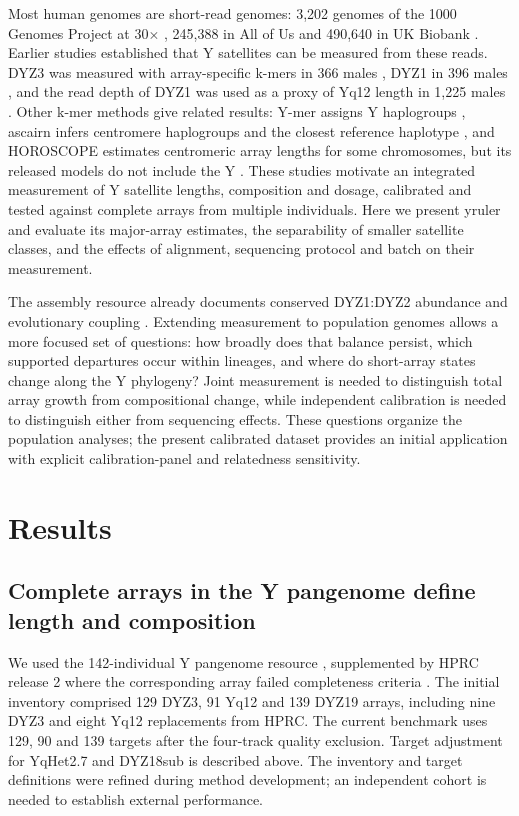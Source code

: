\documentclass[pdflatex,sn-nature]{sn-jnl}
\begin{document}
Most human genomes are short-read genomes: 3,202 genomes of the 1000 Genomes Project at 30$\times$ \cite{ByrskaBishop2022}, 245,388 in All of Us \cite{AoU2024} and 490,640 in UK Biobank \cite{UKB2025}. Earlier studies established that Y satellites can be measured from these reads. DYZ3 was measured with array-specific k-mers in 366 males \cite{Miga2014}, DYZ1 in 396 males \cite{Altemose2014}, and the read depth of DYZ1 was used as a proxy of Yq12 length in 1,225 males \cite{SanRoman2024}. Other k-mer methods give related results: Y-mer assigns Y haplogroups \cite{Puurand2025}, ascairn infers centromere haplogroups and the closest reference haplotype \cite{Shiraishi2026}, and HOROSCOPE estimates centromeric array lengths for some chromosomes, but its released models do not include the Y \cite{Hain2026}. These studies motivate an integrated measurement of Y satellite lengths, composition and dosage, calibrated and tested against complete arrays from multiple individuals. Here we present yruler and evaluate its major-array estimates, the separability of smaller satellite classes, and the effects of alignment, sequencing protocol and batch on their measurement.

The assembly resource already documents conserved DYZ1:DYZ2 abundance and evolutionary coupling \cite{Hallast2026}. Extending measurement to population genomes allows a more focused set of questions: how broadly does that balance persist, which supported departures occur within lineages, and where do short-array states change along the Y phylogeny? Joint measurement is needed to distinguish total array growth from compositional change, while independent calibration is needed to distinguish either from sequencing effects. These questions organize the population analyses; the present calibrated dataset provides an initial application with explicit calibration-panel and relatedness sensitivity.

\section{Results}\label{sec:results}

\subsection{Complete arrays in the Y pangenome define length and composition}\label{sec:res-truth}
We used the 142-individual Y pangenome resource \cite{Hallast2026}, supplemented by HPRC release 2 where the corresponding array failed completeness criteria \cite{HPRCRelease2}. The initial inventory comprised 129 DYZ3, 91 Yq12 and 139 DYZ19 arrays, including nine DYZ3 and eight Yq12 replacements from HPRC. The current benchmark uses 129, 90 and 139 targets after the four-track quality exclusion. Target adjustment for YqHet2.7 and DYZ18sub is described above. The inventory and target definitions were refined during method development; an independent cohort is needed to establish external performance.
\end{document}
